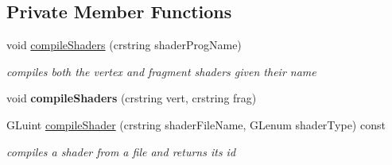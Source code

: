\subsection*{Private Member Functions}
\begin{DoxyCompactItemize}
\item 
\mbox{\label{classnta_1_1GLSLProgram_a6de85b6da0514bb9461268ff4806bed5}} 
void \hyperlink{classnta_1_1GLSLProgram_a6de85b6da0514bb9461268ff4806bed5}{compile\+Shaders} (crstring shader\+Prog\+Name)
\begin{DoxyCompactList}\small\item\em compiles both the vertex and fragment shaders given their name \end{DoxyCompactList}\item 
\mbox{\label{classnta_1_1GLSLProgram_aa2ba21147f40f26f5946f06446fd8f04}} 
void {\bfseries compile\+Shaders} (crstring vert, crstring frag)
\item 
\mbox{\label{classnta_1_1GLSLProgram_a6ec17ca27433ffd2afa0f214fda7eb83}} 
G\+Luint \hyperlink{classnta_1_1GLSLProgram_a6ec17ca27433ffd2afa0f214fda7eb83}{compile\+Shader} (crstring shader\+File\+Name, G\+Lenum shader\+Type) const
\begin{DoxyCompactList}\small\item\em compiles a shader from a file and returns its id \end{DoxyCompactList}\end{DoxyCompactItemize}

